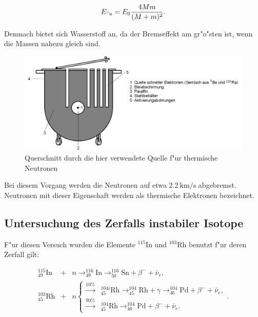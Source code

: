 		\begin{equation*}
			E_{"u} = E_0 \frac{4Mm}{(M+m)^2}.
		\end{equation*}

		Demnach bietet sich Wasserstoff an, da der Bremseffekt am gr"o"sten ist, wenn die Massen nahezu gleich sind.

		\begin{figure}[htbp]
			\centering
			\includegraphics[width = 12cm]{img/Quelle.PNG}
			\caption{Querschnitt durch die hier verwendete Quelle f"ur thermische Neutronen}
			\label{quelle}
		\end{figure}

		Bei diesem Vorgang werden die Neutronen auf etwa $\SI{2.2}{\kilo\meter\per\second}$ abgebremst. Neutronen mit dieser Eigenschaft werden als thermische Elektronen bezeichnet.

	\subsection{Untersuchung des Zerfalls instabiler Isotope}
	\label{sub:untersuchung_des_zerfalls_instabiler_isotope}
	
		F"ur diesen Versuch wurden die Elemente $^{115}\mathrm{In}$ und $^{103}\mathrm{Rh}$ benutzt f"ur deren Zerfall gilt:

		\begin{eqnarray*}
			^{115}_{49}\mathrm{In} &+& n \rightarrow ^{116}_{49}\mathrm{In} \rightarrow ^{116}_{50}\mathrm{Sn} + \beta^- + \bar{\nu}_e,\\
			^{103}_{45}\mathrm{Rh} &+& n \left\{
			\begin{array}{ll}
			 	 \xrightarrow{10\%} & ^{104i}_{45}\mathrm{Rh} \rightarrow ^{104}_{45}\mathrm{Rh} + \gamma \rightarrow ^{104}_{46}\mathrm{Pd} +\beta^- +\bar{\nu}_e,\\
			 	  \xrightarrow{90\%} & ^{104}_{45}\mathrm{Rh} \rightarrow ^{104}_{46}\mathrm{Pd} +\beta^- +\bar{\nu}_e.
			\end{array}.
			\right.
		\end{eqnarray*}

